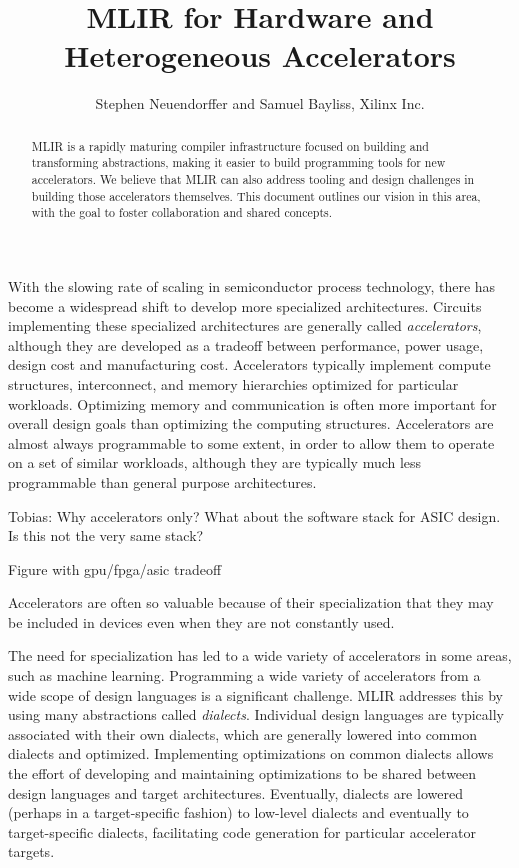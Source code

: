 \documentclass{tufte-handout}
\title{MLIR for Hardware and Heterogeneous Accelerators}
\author{Stephen Neuendorffer and Samuel Bayliss, Xilinx Inc.}
\begin{document}
\maketitle%

\begin{abstract}
\noindent MLIR\cite{lattner2020mlir} is a rapidly maturing compiler infrastructure focused on building and transforming abstractions, making it easier to build programming tools for new accelerators.  We believe that MLIR can also address tooling and design challenges in building those accelerators themselves.  This document outlines our vision in this area, with the goal to foster collaboration and shared concepts.\end{abstract}



With the slowing rate of scaling in semiconductor process technology, there has become a widespread shift to develop more specialized architectures.  Circuits implementing these specialized architectures are generally called \emph{accelerators}, although they are developed as a tradeoff between performance, power usage, design cost and manufacturing cost. Accelerators typically implement compute structures, interconnect, and memory hierarchies optimized for particular workloads.  Optimizing memory and communication is often more important for overall design goals than optimizing the computing structures\cite{dallymemorywall}. Accelerators are almost always programmable to some extent, in order to allow them to operate on a set of similar workloads, although they are typically much less programmable than general purpose architectures.\begin{marginfigure} Tobias: Why accelerators only? What about the software stack for ASIC design. Is this not the very same stack? \end{marginfigure}\begin{marginfigure} Figure with gpu/fpga/asic tradeoff\end{marginfigure} Accelerators are often so valuable because of their specialization that they may be included in devices even when they are not constantly used\cite{hadi11darksilicon}.

The need for specialization has led to a wide variety of accelerators in some areas, such as machine learning\cite{hotchips2019}.  Programming a wide variety of accelerators from a wide scope of design languages is a significant challenge.  MLIR addresses this by using many abstractions called \emph{dialects}.  Individual design languages are typically associated with their own dialects, which are generally lowered into common dialects and optimized.  Implementing optimizations on common dialects allows the effort of developing and maintaining optimizations to be shared between design languages and target architectures.  Eventually, dialects are lowered (perhaps in a target-specific fashion) to low-level dialects and eventually to target-specific dialects, facilitating code generation for particular accelerator targets\cite{bondhugula2020high}.
\end{document}
